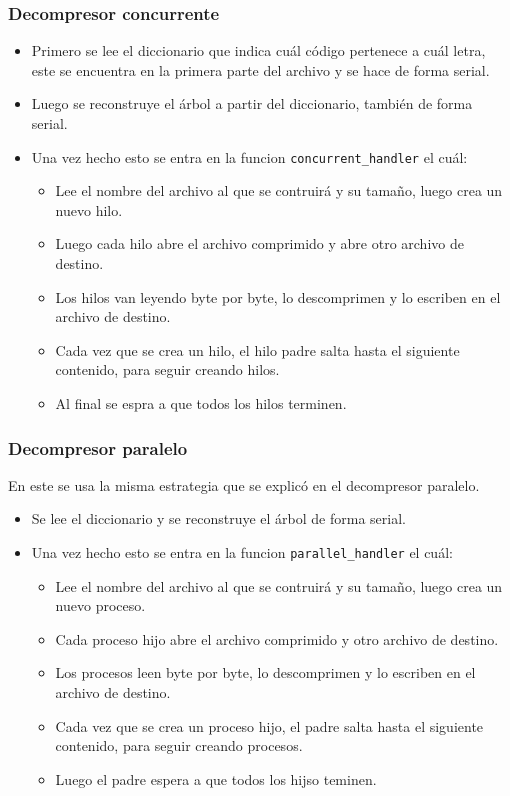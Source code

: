 \documentclass{report}
\begin{document}
\subsubsection {Decompresor concurrente}
\begin {itemize}
    \item Primero se lee el diccionario que indica cuál código pertenece a cuál letra, este se encuentra en la primera parte del archivo y se hace de forma serial.
    \item Luego se reconstruye el árbol a partir del diccionario, también de forma serial.
    \item Una vez hecho esto se entra en la funcion \texttt{concurrent\_handler} el cuál:
        \begin{itemize}
            \item Lee el nombre del archivo al que se contruirá y su tamaño, luego crea un nuevo hilo.
            \item Luego cada hilo abre el archivo comprimido y abre otro archivo de destino.
            \item Los hilos van leyendo byte por byte, lo descomprimen y lo escriben en el archivo de destino.
            \item Cada vez que se crea un hilo, el hilo padre salta hasta el siguiente contenido, para seguir creando hilos.
            \item Al final se espra a que todos los hilos terminen.
        \end{itemize}
\end {itemize}

\subsubsection {Decompresor paralelo}
En este se usa la misma estrategia que se explicó en el decompresor paralelo. 
\begin {itemize}
    \item Se lee el diccionario y se reconstruye el árbol de forma serial.
    \item Una vez hecho esto se entra en la funcion \texttt{parallel\_handler} el cuál:
        \begin{itemize}
            \item Lee el nombre del archivo al que se contruirá y su tamaño, luego crea un nuevo proceso.
            \item Cada proceso hijo abre el archivo comprimido y otro archivo de destino.
            \item Los procesos leen byte por byte, lo descomprimen y lo escriben en el archivo de destino.
            \item Cada vez que se crea un proceso hijo, el padre salta hasta el siguiente contenido, para seguir creando procesos.
            \item Luego el padre espera a que todos los hijso teminen.
        \end{itemize}
\end {itemize}
\end{document}
